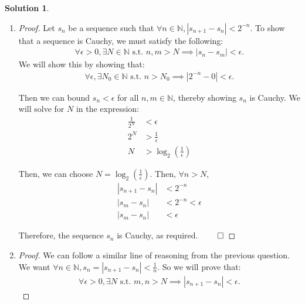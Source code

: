 \documentclass[12pt]{article}
\theoremstyle{definition} %
\newtheorem{solution}{Solution}
\theoremstyle{plain} %
\begin{document}
\begin{solution}
    \begin{enumerate}
        \item \begin{proof}
            Let $s_n$ be a sequence such that $\forall n \in \mathbb{N}, |s_{n+1} - s_n| < 2^{-n}$. To show that a sequence is Cauchy, we must satisfy the following: 
            \begin{align}
            \forall \epsilon > 0, \exists N \in \mathbb{N} \text{ s.t. } n, m > N \implies |s_n - s_m| < \epsilon.
            \end{align}
            We will show this by showing that:
            \begin{align}
            \forall \epsilon, \exists N_0 \in \mathbb{N} \text{ s.t. } n > N_0 \implies |2^{-n} - 0| < \epsilon.
            \end{align}
        
            Then we can bound $s_n < \epsilon$ for all $n, m \in \mathbb{N}$, thereby showing $s_n$ is Cauchy. We will solve for $N$ in the expression:
            \begin{align}
                \frac{1}{2^N} &< \epsilon \tag{34} \\
                2^N &> \frac{1}{\epsilon} \tag{35} \\
                N &> \log_2 \left( \frac{1}{\epsilon} \right) \tag{36}
            \end{align}
        
            Then, we can choose $N = \log_2 \left( \frac{1}{\epsilon} \right)$. Then, $\forall n > N$,
            \begin{align}
                |s_{n+1} - s_n| &< 2^{-n} \tag{37} \\
                |s_m - s_n| &< 2^{-n} < \epsilon \tag{38} \\
                |s_m - s_n| &< \epsilon \tag{39}
            \end{align}
        
            Therefore, the sequence $s_n$ is Cauchy, as required. $\qed$
        \end{proof}
        \item \begin{proof}
            We can follow a similar line of reasoning from the previous question. We want $\forall n \in \mathbb{N}, s_n = |s_{n+1} - s_n| < \frac{1}{n}$. So we will prove that:
            \begin{align}
            \forall \epsilon > 0, \exists N \text{ s.t. } m, n > N \implies |s_{n+1} - s_n| < \epsilon.
            \end{align}
        

\end{proof}
\end{enumerate}
\end{solution}
\end{document}
